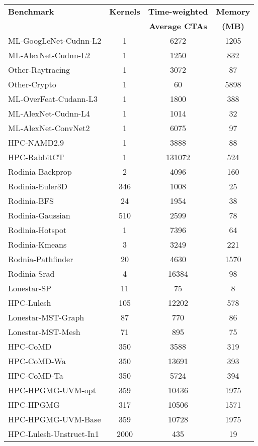 \begin{table}[t]
\begin{small}
\centering
\begin{tabular}{lccc}
 \toprule
 \textbf{Benchmark} & \textbf{Kernels} & \textbf{Time-weighted} & \textbf{Memory} \\
& & \textbf{Average CTAs} & \textbf{(MB)} \\
 \toprule
ML-GoogLeNet-Cudnn-L2 & 1 & 6272 & 1205 \\
ML-AlexNet-Cudnn-L2 & 1 & 1250 & 832 \\
Other-Raytracing & 1 & 3072 & 87 \\
Other-Crypto & 1 & 60 & 5898 \\
ML-OverFeat-Cudann-L3 & 1 & 1800 & 388 \\
ML-AlexNet-Cudnn-L4 & 1 & 1014 & 32 \\
ML-AlexNet-ConvNet2 & 1 & 6075 & 97 \\
HPC-NAMD2.9 & 1 & 3888 & 88 \\
HPC-RabbitCT & 1 & 131072 & 524 \\
Rodinia-Backprop & 2 & 4096 & 160 \\
Rodinia-Euler3D & 346 & 1008 & 25 \\
Rodinia-BFS & 24 & 1954 & 38 \\
Rodinia-Gaussian & 510 & 2599 & 78 \\
Rodinia-Hotspot & 1 & 7396 & 64 \\
Rodinia-Kmeans & 3 & 3249 & 221 \\
Rodnia-Pathfinder & 20 & 4630 & 1570 \\
Rodinia-Srad & 4 & 16384 & 98 \\
Lonestar-SP & 11 & 75 & 8 \\
HPC-Lulesh & 105 & 12202 & 578 \\
Lonestar-MST-Graph & 87 & 770 & 86 \\
Lonestar-MST-Mesh & 71 & 895 & 75 \\
HPC-CoMD & 350 & 3588 & 319 \\
HPC-CoMD-Wa & 350 & 13691 & 393 \\
HPC-CoMD-Ta & 350 & 5724 & 394 \\
HPC-HPGMG-UVM-opt & 359 & 10436 & 1975 \\
HPC-HPGMG & 317 & 10506 & 1571 \\
HPC-HPGMG-UVM-Base & 359 & 10728 & 1975 \\
HPC-Lulesh-Unstruct-In1 & 2000 & 435 & 19 \\

\end{tabular}
\end{small}
\end{table}
